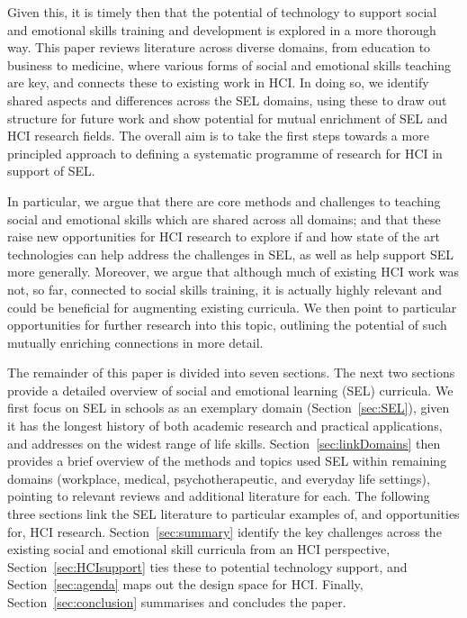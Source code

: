 \documentclass[prodmode,acmtochi]{acmsmall}
\newcommand{\rephrase}[1]{\textrm{\textrm{\textcolor{gray}{#1}}}}
\begin{document}
Given this, it is timely then that the potential of technology to support social and emotional skills training and development is explored in a more thorough way.
This paper reviews literature across diverse domains, from education to business to medicine, where various forms of social and emotional skills teaching are key, and connects these to existing work in HCI. 
%
In doing so, we identify shared aspects and differences across the SEL domains, using these to draw out structure for future work and show potential for mutual enrichment of SEL and HCI research fields. 
%
The overall aim is to take the first steps towards a more principled approach
to defining a systematic programme of research for HCI in support of SEL. 

In particular, we argue that there are core methods and challenges to teaching social and emotional skills which are shared across all domains; and that these raise new opportunities for HCI research to explore if and how state of the art technologies can help address the challenges in SEL, as well as help support SEL more generally.
%
%
Moreover, we argue that although much of existing HCI work was not, so far, connected to social skills training, it is actually highly relevant and could be beneficial for augmenting existing curricula.
%
We then point to particular opportunities for further research into this topic, outlining the potential of such mutually enriching connections in more detail. 


The remainder of this paper is divided into seven sections. The next two sections provide a detailed overview of social and emotional learning (SEL) curricula.  We first focus on SEL in schools  as an exemplary domain (Section~\ref{sec:SEL}), given it has the longest history of both academic research and practical applications, and addresses on the widest range of life skills. Section~\ref{sec:linkDomains} then provides a brief overview of the methods and topics used SEL within remaining domains  (workplace, medical, psychotherapeutic, and everyday life settings), pointing to relevant reviews and additional literature for each. The following three sections link the SEL literature to particular examples of, and opportunities for, HCI research. Section~\ref{sec:summary} identify the key challenges across the existing social and emotional skill curricula from an HCI perspective, Section~\ref{sec:HCIsupport} ties these to potential technology support, and Section~\ref{sec:agenda} maps out the design space for HCI. Finally, Section~\ref{sec:conclusion} summarises and concludes the paper.
        
\end{document}
